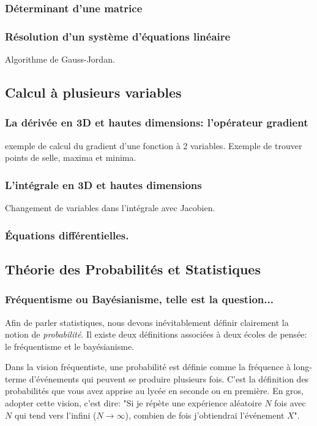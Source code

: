 \documentclass[titlepage]{article}
\theoremstyle{cleanremark}
\begin{document}
\subsubsection{Déterminant d'une matrice}

\subsubsection{Résolution d'un système d'équations linéaire}

Algorithme de Gauss-Jordan.


\subsection{Calcul à plusieurs variables}
\subsubsection{La dérivée en 3D et hautes dimensions: l'opérateur gradient}
exemple de calcul du gradient d'une fonction à 2 variables. Exemple de trouver points de selle, maxima et minima. 

\subsubsection{L'intégrale en 3D et hautes dimensions}


Changement de variables dans l'intégrale avec Jacobien. 

\subsubsection{Équations différentielles.}

\subsection{Théorie des Probabilités et Statistiques}
\subsubsection{Fréquentisme ou Bayésianisme, telle est la question...}
Afin de parler statistiques, nous devons inévitablement définir clairement la notion de \textit{probabilité}. 
Il existe deux définitions associées à deux écoles de pensée: le fréquentisme et le bayésianisme. 

Dans la vision fréquentiste, une probabilité est définie comme la fréquence à long-terme d'événements qui peuvent se produire plusieurs fois. C'est la définition des probabilités que vous avez apprise au lycée en seconde ou en première. En gros, adopter cette vision, c'est dire: "Si je répète une  expérience aléatoire $N$ fois avec $N$ qui tend vers l'infini ($N\rightarrow\infty$), combien de fois j'obtiendrai l'événement $X$".
\end{document}
